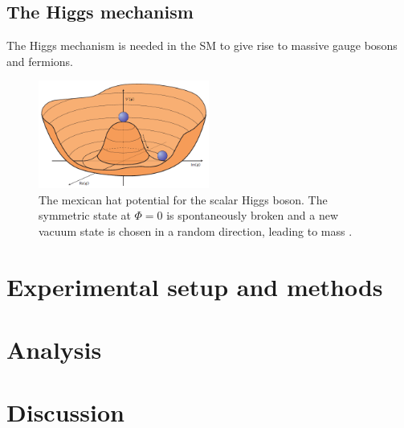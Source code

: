 \documentclass[twoside,        %
               BCOR12mm,       %
               ngerman,english, %
               fleqn,headsepline=false,footsepline=false
              ]{Vorlage/MFPREPORT}
\begin{document}
\subsection{The Higgs mechanism}

The Higgs mechanism is needed in the SM to give rise to massive gauge bosons
and fermions. 

\begin{figure}[]
    \centering
    \includegraphics[width=0.5\textwidth]{fig/higgspotential}
    \caption{The mexican hat potential for the scalar Higgs boson. The
    symmetric state at $\Phi=0$ is spontaneously broken and a new vacuum state
is chosen in a random direction, leading to mass \cite{mexhat}.}
    \label{fig:mexhat}
\end{figure}




\section{Experimental setup and methods}
\label{sec:setup}

\section{Analysis}
\label{sec:analysis}

\section{Discussion}
\label{sec:discussion}



\newpage

\begin{appendices}
\end{appendices}
\end{document}
